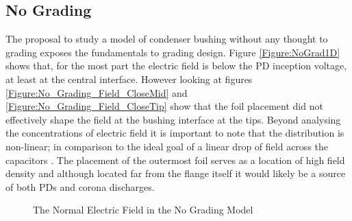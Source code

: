 \subsection{No Grading}
The proposal to study a model of condenser bushing without any thought to grading exposes the fundamentals to grading design. Figure \ref{Figure:NoGrad1D} shows that, for the most part the electric field is below the PD inception voltage, at least at the central interface. However looking at figures \ref{Figure:No_Grading_Field_CloseMid} and \ref{Figure:No_Grading_Field_CloseTip} show that the foil placement did not effectively shape the field at the bushing interface at the tips.  Beyond analysing the concentrations of electric field it is important to note that the distribution is non-linear; in comparison to the ideal goal of a linear drop of field across the capacitors \citep{kuffel2000high}. The placement of the outermost foil serves as a location of high field density and although located far from the flange itself it would likely be a source of both PDs and corona discharges. 

\begin{figure}[!h]
  \centering
{} 
\caption{The Normal Electric Field in the No Grading Model}
\label{Figure:No_Grad_Failing}
\end{figure}


